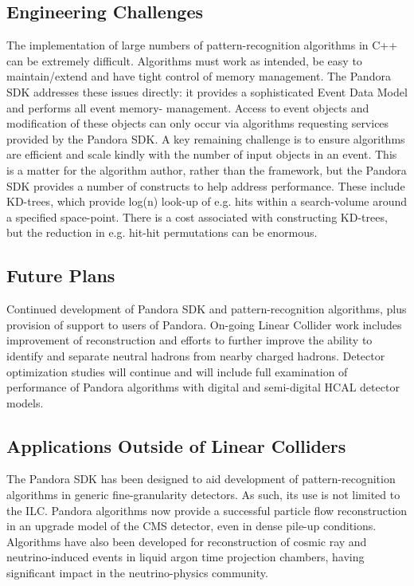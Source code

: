 \subsection{Engineering Challenges}
The implementation of large numbers of pattern-recognition algorithms in C++ can
be extremely difficult. Algorithms must work as intended, be easy to
maintain/extend and have tight control of memory management. The Pandora SDK
addresses these issues directly: it provides a sophisticated Event Data Model
and performs all event memory- management. Access to event objects and
modification of these objects can only occur via algorithms requesting services
provided by the Pandora SDK. A key remaining challenge is to ensure algorithms
are efficient and scale kindly with the number of input objects in an event.
This is a matter for the algorithm author, rather than the framework, but the
Pandora SDK provides a number of constructs to help address performance. These
include KD-trees, which provide log(n) look-up of e.g. hits within a
search-volume around a specified space-point. There is a cost associated with
constructing KD-trees, but the reduction in e.g. hit-hit permutations can be
enormous.

\subsection{Future Plans}
Continued development of Pandora SDK and pattern-recognition algorithms, plus
provision of support to users of Pandora. On-going Linear Collider work includes improvement
of \PGpz reconstruction and efforts to further improve the ability to identify and
separate neutral hadrons from nearby charged hadrons. Detector optimization
studies will continue and will include full examination of performance of
Pandora algorithms with digital and semi-digital HCAL detector models.

\subsection{Applications Outside of Linear Colliders}
The Pandora SDK has been designed to aid development of pattern-recognition
algorithms in generic fine-granularity detectors. As such, its use is not
limited to the ILC. Pandora algorithms now provide a successful particle flow
reconstruction in an upgrade model of the CMS detector, even in dense pile-up
conditions. Algorithms have also been developed for reconstruction of cosmic ray
and neutrino-induced events in liquid argon time projection chambers, having
significant impact in the neutrino-physics community.

